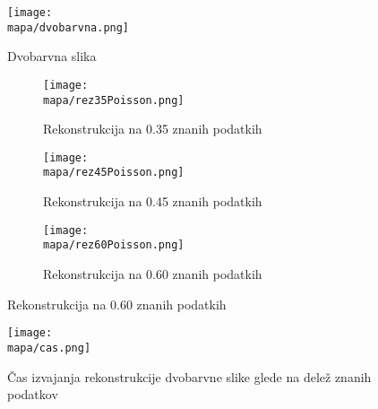 \renewcommand{\mapa}{Poglavja/Slike/dvobarvna}

\begin{figure}[!ht]
    \centering
    \texttt{[image: \\mapa/dvobarvna.png]}
    \caption{Dvobarvna slika}
\end{figure}

\begin{figure}[!ht]
    \begin{subfigure}{0.32\linewidth}
        \texttt{[image: \\mapa/rez35Poisson.png]}
        \caption{Rekonstrukcija na 0.35 znanih podatkih}
    \end{subfigure}
    \hfill
    \begin{subfigure}{0.32\linewidth}
        \texttt{[image: \\mapa/rez45Poisson.png]}
        \caption{Rekonstrukcija na 0.45 znanih podatkih}
    \end{subfigure}
    \hfill
    \begin{subfigure}{0.32\linewidth}
        \texttt{[image: \\mapa/rez60Poisson.png]}
        \caption{Rekonstrukcija na 0.60 znanih podatkih}
    \end{subfigure}
\end{figure}

\begin{figure}[!ht]
    \centering
    \texttt{[image: \\mapa/cas.png]}
    \caption{Čas izvajanja rekonstrukcije dvobarvne slike glede na delež znanih podatkov}
\end{figure}